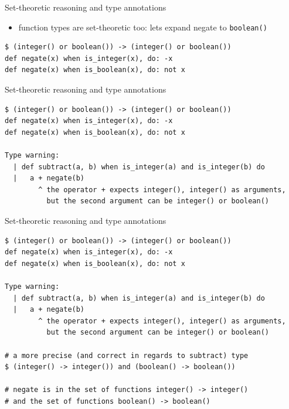 \documentclass[
  ignorenonframetext,
  aspectratio=169]{beamer}
\newcommand{\passthrough}[1]{#1}
\providecommand{\tightlist}{%
  \setlength{\itemsep}{0pt}\setlength{\parskip}{0pt}}
\begin{document}
\begin{frame}[fragile]{Set-theoretic reasoning and type annotations}
\label{set-theoretic-reasoning-and-type-annotations-6}
\begin{itemize}
\tightlist
\item
  function types are set-theoretic too: let\textquotesingle s expand
  negate to \passthrough{\lstinline!boolean()!}
\end{itemize}

\begin{lstlisting}
$ (integer() or boolean()) -> (integer() or boolean())
def negate(x) when is_integer(x), do: -x
def negate(x) when is_boolean(x), do: not x
\end{lstlisting}
\end{frame}

\begin{frame}[fragile]{Set-theoretic reasoning and type annotations}
\label{set-theoretic-reasoning-and-type-annotations-7}
\begin{lstlisting}
$ (integer() or boolean()) -> (integer() or boolean())
def negate(x) when is_integer(x), do: -x
def negate(x) when is_boolean(x), do: not x

Type warning:
  | def subtract(a, b) when is_integer(a) and is_integer(b) do
  |   a + negate(b)
        ^ the operator + expects integer(), integer() as arguments,
          but the second argument can be integer() or boolean()

\end{lstlisting}
\end{frame}

\begin{frame}[fragile]{Set-theoretic reasoning and type annotations}
\label{set-theoretic-reasoning-and-type-annotations-8}
\begin{lstlisting}
$ (integer() or boolean()) -> (integer() or boolean())
def negate(x) when is_integer(x), do: -x
def negate(x) when is_boolean(x), do: not x

Type warning:
  | def subtract(a, b) when is_integer(a) and is_integer(b) do
  |   a + negate(b)
        ^ the operator + expects integer(), integer() as arguments,
          but the second argument can be integer() or boolean()

# a more precise (and correct in regards to subtract) type
$ (integer() -> integer()) and (boolean() -> boolean())

# negate is in the set of functions integer() -> integer()
# and the set of functions boolean() -> boolean()
\end{lstlisting}
\end{frame}
\end{document}
